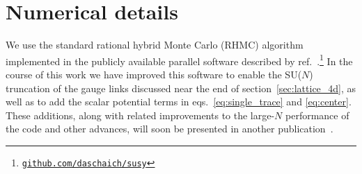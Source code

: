 \section{\label{app:num}Numerical details}
We use the standard rational hybrid Monte Carlo (RHMC) algorithm~\cite{Clark:2006fx} implemented in the publicly available parallel software described by ref.~\cite{Schaich:2014pda}.\footnote{{\tt\href{https://github.com/daschaich/susy}{github.com/daschaich/susy}}}
In the course of this work we have improved this software to enable the SU($N$) truncation of the gauge links discussed near the end of section~\ref{sec:lattice_4d}, as well as to add the scalar potential terms in eqs.~\eqref{eq:single_trace} and \eqref{eq:center}.
These additions, along with related improvements to the large-$N$ performance of the code and other advances, will soon be presented in another publication~\cite{parallel_imp}.

